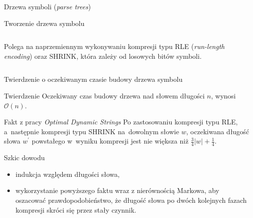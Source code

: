 \documentclass[polish]{beamer}
\begin{document}
\begin{frame}[fragile]{Drzewa symboli (\textit{parse trees})}
\begin{block}{Tworzenie drzewa symbolu}
        \begin{columns}
            \begin{column}{0.58\textwidth}
                Polega na naprzemiennym wykonywaniu kompresji typu RLE (\textit{run-length encoding}) oraz SHRINK, która zależy od losowych bitów symboli.
            \end{column}
                \begin{column}{0.38\textwidth}
                \begin{center}
                    \scalebox{0.3}{\usebox{\eighthbox}}
                \end{center}
            \end{column}
        \end{columns}
    \end{block}
\end{frame}

\begin{frame}{Twierdzenie o oczekiwanym czasie budowy drzewa symbolu}
    \begin{alertblock}{Twierdzenie}
        Oczekiwany czas budowy drzewa nad słowem długości $n$, wynosi $\mathcal{O}(n)$.
    \end{alertblock}
    \pause
    \begin{block}{Fakt z pracy \textit{Optimal Dynamic Strings}}
        Po zastosowaniu kompresji typu RLE, a~następnie kompresji typu SHRINK na~dowolnym słowie $w$, oczekiwana długość słowa $w^\prime$ powstałego w~wyniku kompresji jest nie większa niż $\frac{3}{4}|w| + \frac{1}{4}$.
    \end{block}
    \pause
    \begin{block}{Szkic dowodu}
        \begin{itemize}
            \item indukcja względem długości słowa,
            \item wykorzystanie powyższego faktu wraz z nierównością Markowa, aby oszacować prawdopodobieństwo, że długość słowa po dwóch kolejnych fazach kompresji skróci się przez stały czynnik.
        \end{itemize}
    \end{block}
\end{frame}

\newsavebox{\ninethbox}
\end{document}
